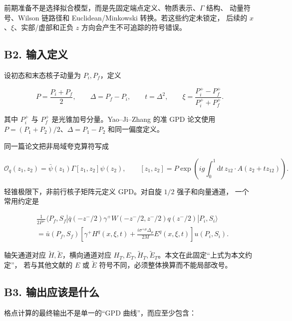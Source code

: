 \documentclass[UTF8]{ctexart}
\newcommand{\dd}{\mathrm{d}}
\begin{document}
前期准备不是选择拟合模型，而是先固定端点定义、物质表示、$\Gamma$ 结构、
动量符号、Wilson 链路径和 Euclidean/Minkowski 转换。若这些约定未锁定，
后续的 $x$、$\xi$、实部/虚部和正负 $z$ 方向会产生不可追踪的符号错误。

\subsection{B2. 输入定义}

设初态和末态核子动量为 $P_i,P_f$，定义

\begin{equation}
P=\frac{P_i+P_f}{2},\qquad
\Delta=P_f-P_i,\qquad
t=\Delta^2,\qquad
\xi=\frac{P_i^+-P_f^+}{P_i^++P_f^+}.
\label{eq:kinematics}
\end{equation}

其中 $P_i^+$ 与 $P_f^+$ 是光锥加号分量。Yao--Ji--Zhang 的准 GPD 论文使用
$P=(P_1+P_2)/2$、$\Delta=P_1-P_2$ 和同一偏度定义。 \cite{P1}

同一篇论文把非局域夸克算符写成

\begin{equation}
\mathcal O_q(z_1,z_2)
=\bar\psi(z_1)\Gamma[z_1,z_2]\psi(z_2),
\qquad
[z_1,z_2]=P\exp\!\left(ig\int_0^1\dd t\,z_{12}\cdot A(z_2+tz_{12})\right).
\label{eq:qbilocal}
\end{equation}

轻锥极限下，非前行核子矩阵元定义 GPD。对自旋 $1/2$ 强子和向量通道，
一个常用约定是

\begin{equation}
\begin{aligned}
&\frac{1}{2P^+}
\langle P_f,S_f|\bar q(-z^-/2)\gamma^+
W(-z^-/2,z^-/2)q(z^-/2)|P_i,S_i\rangle \\
&=\bar u(P_f,S_f)
\left[
\gamma^+H^q(x,\xi,t)
+\frac{i\sigma^{+\mu}\Delta_\mu}{2M}E^q(x,\xi,t)
\right]u(P_i,S_i).
\end{aligned}
\label{eq:quark-decomp}
\end{equation}

轴矢通道对应 $\widetilde H,\widetilde E$，横向通道对应
$H_T,E_T,\widetilde H_T,\widetilde E_T$。本文在此固定“上式为本文约定”，
若与其他文献的 $E$ 或 $\widetilde E$ 符号不同，必须整体换算而不能局部改号。

\subsection{B3. 输出应该是什么}

格点计算的最终输出不是单一的“GPD 曲线”，而应至少包含：
\end{document}
